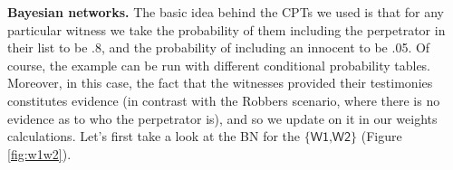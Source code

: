 \documentclass[
  10pt,
]{scrartcl}
\newcommand{\s}[1]{\textsf{#1}}
\begin{document}
\noindent \textbf{Bayesian networks.} The basic idea behind the CPTs we used is that for any particular witness we take the probability of them including the perpetrator in their list to be .8, and the probability of including an innocent to be .05. Of course, the example can be run with different conditional probability tables. Moreover, in this case, the fact that the witnesses provided their testimonies constitutes evidence (in contrast with the Robbers scenario, where there is no evidence as to who the perpetrator is), and so we update on it in our weights calculations. Let's first take a look at the BN for the \(\{\s{W1,W2}\}\) (Figure \ref{fig:w1w2}).

\vspace{1mm}
\footnotesize

\normalsize
\end{document}
